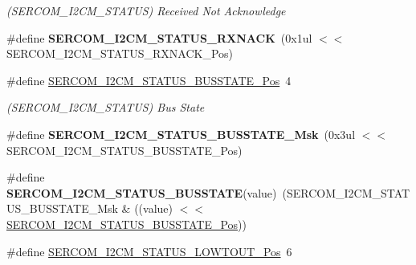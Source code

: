 \begin{DoxyCompactItemize}
\begin{DoxyCompactList}\small\item\em (S\+E\+R\+C\+O\+M\+\_\+\+I2\+C\+M\+\_\+\+S\+T\+A\+T\+U\+S) Received Not Acknowledge \end{DoxyCompactList}\item 
\hypertarget{group___s_a_m_l21___s_e_r_c_o_m_ga4839bd13b5f300b21641ead6166558bf}{}\#define {\bfseries S\+E\+R\+C\+O\+M\+\_\+\+I2\+C\+M\+\_\+\+S\+T\+A\+T\+U\+S\+\_\+\+R\+X\+N\+A\+C\+K}~(0x1ul $<$$<$ S\+E\+R\+C\+O\+M\+\_\+\+I2\+C\+M\+\_\+\+S\+T\+A\+T\+U\+S\+\_\+\+R\+X\+N\+A\+C\+K\+\_\+\+Pos)\label{group___s_a_m_l21___s_e_r_c_o_m_ga4839bd13b5f300b21641ead6166558bf}

\item 
\hypertarget{group___s_a_m_l21___s_e_r_c_o_m_ga8bd0084b4337f2d729849cb737f83fb9}{}\#define \hyperlink{group___s_a_m_l21___s_e_r_c_o_m_ga8bd0084b4337f2d729849cb737f83fb9}{S\+E\+R\+C\+O\+M\+\_\+\+I2\+C\+M\+\_\+\+S\+T\+A\+T\+U\+S\+\_\+\+B\+U\+S\+S\+T\+A\+T\+E\+\_\+\+Pos}~4\label{group___s_a_m_l21___s_e_r_c_o_m_ga8bd0084b4337f2d729849cb737f83fb9}

\begin{DoxyCompactList}\small\item\em (S\+E\+R\+C\+O\+M\+\_\+\+I2\+C\+M\+\_\+\+S\+T\+A\+T\+U\+S) Bus State \end{DoxyCompactList}\item 
\hypertarget{group___s_a_m_l21___s_e_r_c_o_m_ga7b66e84f0bc1bc6f99fc7f5aca49852d}{}\#define {\bfseries S\+E\+R\+C\+O\+M\+\_\+\+I2\+C\+M\+\_\+\+S\+T\+A\+T\+U\+S\+\_\+\+B\+U\+S\+S\+T\+A\+T\+E\+\_\+\+Msk}~(0x3ul $<$$<$ S\+E\+R\+C\+O\+M\+\_\+\+I2\+C\+M\+\_\+\+S\+T\+A\+T\+U\+S\+\_\+\+B\+U\+S\+S\+T\+A\+T\+E\+\_\+\+Pos)\label{group___s_a_m_l21___s_e_r_c_o_m_ga7b66e84f0bc1bc6f99fc7f5aca49852d}

\item 
\hypertarget{group___s_a_m_l21___s_e_r_c_o_m_gad5d23027319b30fef7f6b67e04068e16}{}\#define {\bfseries S\+E\+R\+C\+O\+M\+\_\+\+I2\+C\+M\+\_\+\+S\+T\+A\+T\+U\+S\+\_\+\+B\+U\+S\+S\+T\+A\+T\+E}(value)~(S\+E\+R\+C\+O\+M\+\_\+\+I2\+C\+M\+\_\+\+S\+T\+A\+T\+U\+S\+\_\+\+B\+U\+S\+S\+T\+A\+T\+E\+\_\+\+Msk \& ((value) $<$$<$ \hyperlink{group___s_a_m_l21___s_e_r_c_o_m_ga8bd0084b4337f2d729849cb737f83fb9}{S\+E\+R\+C\+O\+M\+\_\+\+I2\+C\+M\+\_\+\+S\+T\+A\+T\+U\+S\+\_\+\+B\+U\+S\+S\+T\+A\+T\+E\+\_\+\+Pos}))\label{group___s_a_m_l21___s_e_r_c_o_m_gad5d23027319b30fef7f6b67e04068e16}

\item 
\hypertarget{group___s_a_m_l21___s_e_r_c_o_m_ga05e38e86854d4644a7d10b9e7086073a}{}\#define \hyperlink{group___s_a_m_l21___s_e_r_c_o_m_ga05e38e86854d4644a7d10b9e7086073a}{S\+E\+R\+C\+O\+M\+\_\+\+I2\+C\+M\+\_\+\+S\+T\+A\+T\+U\+S\+\_\+\+L\+O\+W\+T\+O\+U\+T\+\_\+\+Pos}~6\label{group___s_a_m_l21___s_e_r_c_o_m_ga05e38e86854d4644a7d10b9e7086073a}


\end{DoxyCompactItemize}
